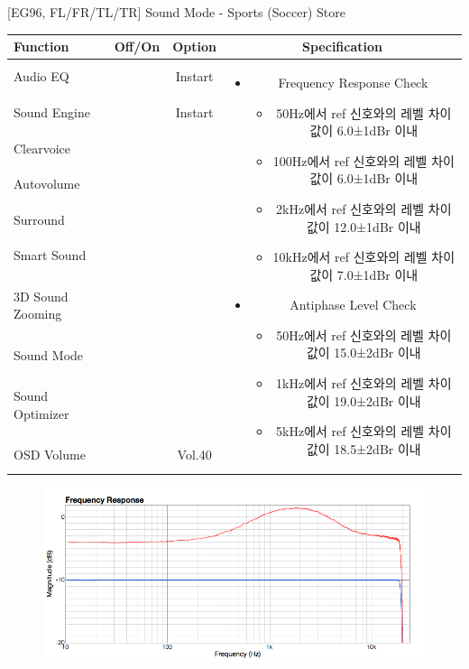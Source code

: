 \documentclass{beamer}
\begin{document}
\begin{frame}[t]{[EG96, FL/FR/TL/TR] Sound Mode - Sports (Soccer) Store}
\begin{tiny}
\begin{tabular}{@{}lccc@{}}
\toprule
Function & Off/On & Option & Specification \\
\midrule
Audio EQ & \color{black}{Off} & Instart &
\multirow{10}{60mm}{
\begin{itemize}
\item Frequency Response Check
	\begin{itemize}
	\item 50Hz에서 ref 신호와의 레벨 차이값이 6.0±1dBr 이내
	\item 100Hz에서 ref 신호와의 레벨 차이값이 6.0±1dBr 이내
	\item 2kHz에서 ref 신호와의 레벨 차이값이 12.0±1dBr 이내
	\item 10kHz에서 ref 신호와의 레벨 차이값이 7.0±1dBr 이내
	\end{itemize}
\item Antiphase Level Check
	\begin{itemize}
	\item 50Hz에서 ref 신호와의 레벨 차이값이 15.0±2dBr 이내
	\item 1kHz에서 ref 신호와의 레벨 차이값이 19.0±2dBr 이내
	\item 5kHz에서 ref 신호와의 레벨 차이값이 18.5±2dBr 이내
	\end{itemize}
\end{itemize}
} \\
Sound Engine & \color{blue}{On} & Instart & \\
Clearvoice & \color{black}{Off} & & \\
Autovolume & \color{black}{Off} & & \\
Surround & \color{black}{Off} & & \\
Smart Sound & \color{black}{Off} & & \\
3D Sound Zooming & \color{black}{Off} & & \\
Sound Mode & \color{blue}{On} & \color{blue}{Sports} & \\
Sound Optimizer & \color{black}{Off} & & \\
OSD Volume & \color{blue}{On} & Vol.40 & \\
\midrule
\end{tabular}
\end{tiny}

\begin{figure}[b]
\includegraphics[height=0.4\textwidth]{figure/EG96/sports_store.png}
\end{figure}


\end{frame}
\end{document}
